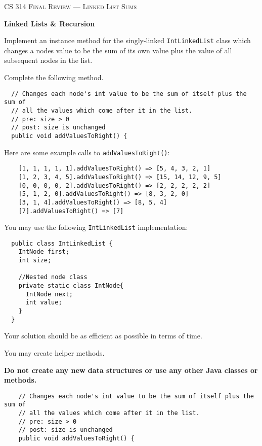 \documentclass[12pt,letter]{article}
\begin{document}
\noindent\textsc{\large CS 314 Final Review --- Linked List Sums}

\vspace{6pt}
\noindent\textbf{Linked Lists \& Recursion}

\vspace{2pt}
\noindent Implement an instance method for the singly-linked \texttt{IntLinkedList} class which changes a nodes value to be the sum of its own value
plus the value of all subsequent nodes in the list.

\vspace{4pt}
\noindent Complete the following method.
\begin{verbatim}
  // Changes each node's int value to be the sum of itself plus the sum of
  // all the values which come after it in the list.
  // pre: size > 0
  // post: size is unchanged
  public void addValuesToRight() {
\end{verbatim}

\vspace{4pt}
\noindent Here are some example calls to \texttt{addValuesToRight()}:
\begin{verbatim}
    [1, 1, 1, 1, 1].addValuesToRight() => [5, 4, 3, 2, 1]
    [1, 2, 3, 4, 5].addValuesToRight() => [15, 14, 12, 9, 5]
    [0, 0, 0, 0, 2].addValuesToRight() => [2, 2, 2, 2, 2]
    [5, 1, 2, 0].addValuesToRight() => [8, 3, 2, 0]
    [3, 1, 4].addValuesToRight() => [8, 5, 4]
    [7].addValuesToRight() => [7]
\end{verbatim}

\vspace{4pt}
\noindent You may use the following \texttt{IntLinkedList} implementation:

\begin{verbatim}
  public class IntLinkedList {
    IntNode first;
    int size;

    //Nested node class
    private static class IntNode{
      IntNode next;
      int value;
    }
  }
\end{verbatim}

\noindent Your solution should be as efficient as possible in terms of time.

\noindent You may create helper methods.

\noindent \textbf{Do not create any new data structures or use any other Java classes or methods.}

\clearpage
\begin{verbatim}
    // Changes each node's int value to be the sum of itself plus the sum of
    // all the values which come after it in the list.
    // pre: size > 0
    // post: size is unchanged
    public void addValuesToRight() {
\end{verbatim}
\end{document}
